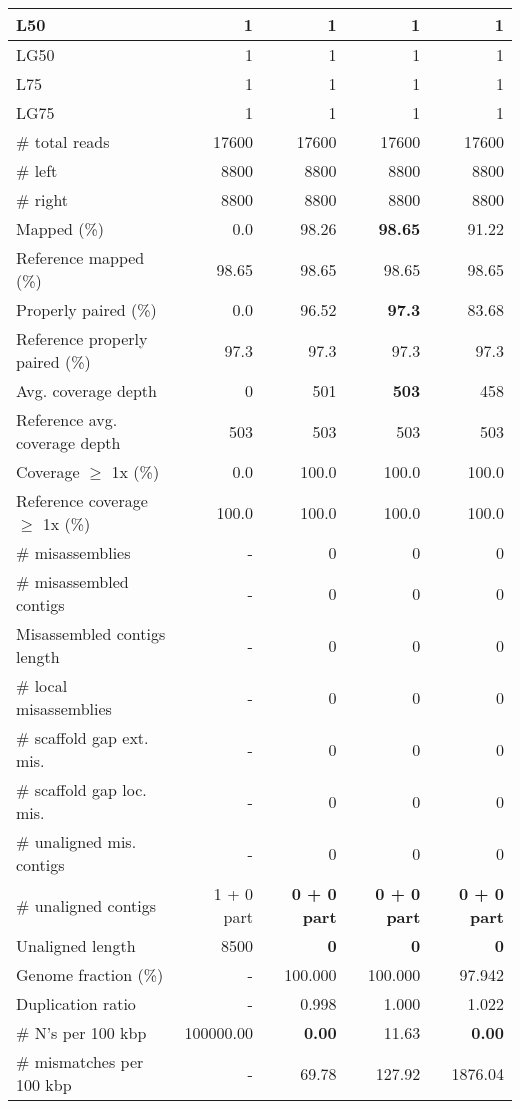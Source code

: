 \documentclass[12pt,a4paper]{article}
\begin{document}
\begin{table}[ht]
\begin{center}
\begin{tabular}{|l*{4}{|r}|}
L50 & 1 & 1 & 1 & 1 \\ \hline
LG50 & 1 & 1 & 1 & 1 \\ \hline
L75 & 1 & 1 & 1 & 1 \\ \hline
LG75 & 1 & 1 & 1 & 1 \\ \hline
\# total reads & 17600 & 17600 & 17600 & 17600 \\ \hline
\# left & 8800 & 8800 & 8800 & 8800 \\ \hline
\# right & 8800 & 8800 & 8800 & 8800 \\ \hline
Mapped (\%) & 0.0 & 98.26 & {\bf 98.65} & 91.22 \\ \hline
Reference mapped (\%) & 98.65 & 98.65 & 98.65 & 98.65 \\ \hline
Properly paired (\%) & 0.0 & 96.52 & {\bf 97.3} & 83.68 \\ \hline
Reference properly paired (\%) & 97.3 & 97.3 & 97.3 & 97.3 \\ \hline
Avg. coverage depth & 0 & 501 & {\bf 503} & 458 \\ \hline
Reference avg. coverage depth & 503 & 503 & 503 & 503 \\ \hline
Coverage $\geq$ 1x (\%) & 0.0 & 100.0 & 100.0 & 100.0 \\ \hline
Reference coverage $\geq$ 1x (\%) & 100.0 & 100.0 & 100.0 & 100.0 \\ \hline
\# misassemblies & - & 0 & 0 & 0 \\ \hline
\# misassembled contigs & - & 0 & 0 & 0 \\ \hline
Misassembled contigs length & - & 0 & 0 & 0 \\ \hline
\# local misassemblies & - & 0 & 0 & 0 \\ \hline
\# scaffold gap ext. mis. & - & 0 & 0 & 0 \\ \hline
\# scaffold gap loc. mis. & - & 0 & 0 & 0 \\ \hline
\# unaligned mis. contigs & - & 0 & 0 & 0 \\ \hline
\# unaligned contigs & 1 + 0 part & {\bf 0 + 0 part} & {\bf 0 + 0 part} & {\bf 0 + 0 part} \\ \hline
Unaligned length & 8500 & {\bf 0} & {\bf 0} & {\bf 0} \\ \hline
Genome fraction (\%) & - & 100.000 & 100.000 & 97.942 \\ \hline
Duplication ratio & - & 0.998 & 1.000 & 1.022 \\ \hline
\# N's per 100 kbp & 100000.00 & {\bf 0.00} & 11.63 & {\bf 0.00} \\ \hline
\# mismatches per 100 kbp & - & 69.78 & 127.92 & 1876.04 \\ \hline

\end{tabular}
\end{center}
\end{table}
\end{document}
